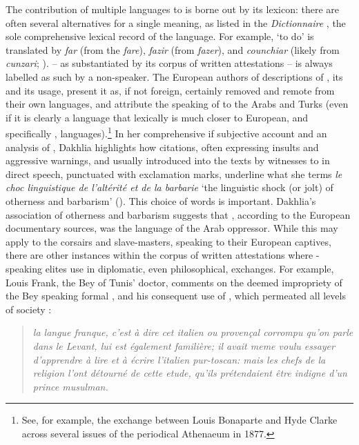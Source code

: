 \documentclass[output=paper]{langsci/langscibook}
\begin{document}
	The contribution of multiple languages to  is borne out by its lexicon: there are often several alternatives for a single meaning, as listed in the \textit{Dictionnaire} \citep{Anonymous1830}, the sole comprehensive lexical record of the language. For example, ‘to do’ is translated by \textit{far} (from the  \textit{fare}), \textit{fazir} (from  \textit{fazer}), and \textit{counchiar} (likely from  \textit{cunzari}; \citealt[316]{Cifoletti2004}).  – as substantiated by its corpus of written attestations – is always labelled as such by a non-speaker. The European authors of descriptions of , its  and its usage, present it as, if not foreign, certainly removed and remote from their own languages, and attribute the speaking of  to the Arabs and Turks (even if it is clearly a language that lexically is much closer to European, and specifically , languages).\footnote{See, for example, the exchange between Louis Bonaparte and Hyde Clarke across several issues of the periodical Athenaeum in 1877.} In her comprehensive if subjective account and an  analysis of , Dakhlia highlights how citations, often expressing insults and aggressive warnings, and usually introduced into the texts by witnesses to  in direct speech, punctuated with exclamation marks, underline what she terms \textit{le choc linguistique de l’altérité et de la barbarie} ‘the linguistic shock (or jolt) of otherness and barbarism’ (\citealt[351]{Dakhlia2008}). This choice of words is important. Dakhlia’s association of otherness and barbarism suggests that , according to the European documentary sources, was the language of the Arab oppressor. While this may apply to the corsairs and slave-masters, speaking  to their European captives, there are other instances within the corpus of written attestations where -speaking elites use  in diplomatic, even philosophical, exchanges. For example, Louis Frank, the Bey of Tunis’ doctor, comments on the deemed impropriety of the Bey speaking formal , and his consequent use of , which permeated all levels of society \citep[70]{Frank1850}:
	
	\begin{quote}
		\textit{la langue franque, c’est à dire cet italien ou provençal corrompu qu’on parle dans le Levant, lui est également familière; il avait meme voulu essayer d’ap\-prendre à lire et à écrire l’italien pur-toscan: mais les chefs de la religion l’ont détourné de cette etude, qu’ils prétendaient être indigne d’un prince musulman.}
	\end{quote}
	
\end{document}

